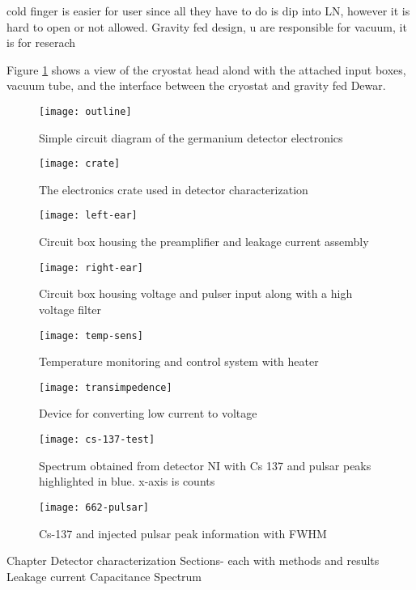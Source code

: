 cold finger is easier for user since all they have to do is dip into LN, however it is hard to open or not allowed.
Gravity fed design, u are responsible for vacuum, it is for reserach

Figure \ref{fig:outline} shows a view of the cryostat head alond with the attached input boxes, vacuum tube, and the interface between the cryostat and gravity fed Dewar.


\begin{figure}[htpb]
\centering
\texttt{[image: outline]}
\caption{Simple circuit diagram of the germanium detector electronics}
\label{fig:outline}
\end{figure}

\begin{figure}[htpb]
\centering
\texttt{[image: crate]}
\caption{The electronics crate used in detector characterization}
\label{fig:crate}
\end{figure}

\begin{figure}[htpb]
\centering
\texttt{[image: left-ear]}
\caption{Circuit box housing the preamplifier and leakage current assembly}
\label{fig:left-ear}
\end{figure}

\begin{figure}[htpb]
\centering
\texttt{[image: right-ear]}
\caption{Circuit box housing voltage and pulser input along with a high voltage filter}
\label{fig:right-ear}
\end{figure}

\begin{figure}[htpb]
\centering
\texttt{[image: temp-sens]}
\caption{Temperature monitoring and control system with heater}
\label{fig:temp-sens}
\end{figure}

\begin{figure}[htpb]
\centering
\texttt{[image: transimpedence]}
\caption{Device for converting low current to voltage}
\label{fig:transimpedence}
\end{figure}

\begin{figure}[htpb]
\centering
\texttt{[image: cs-137-test]}
\caption{Spectrum obtained from detector NI with Cs 137 and pulsar peaks highlighted in blue. x-axis is counts}
\label{fig:cs-137-test}
\end{figure}

\begin{figure}[htpb]
\centering
\texttt{[image: 662-pulsar]}
\caption{Cs-137 and injected pulsar peak information with FWHM}
\label{fig:662-pulsar}
\end{figure}



Chapter Detector characterization
Sections- each with methods and results
Leakage current
Capacitance
Spectrum

